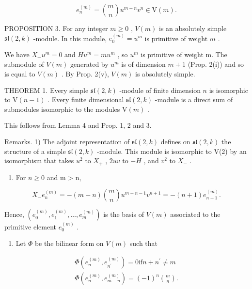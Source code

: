 \[
e _ {n} ^ {(m)} = \binom {m} {n} u ^ {m - n} v ^ {n} \in \mathrm{V} (m).
\]

PROPOSITION 3. For any integer \(m \geq 0\) , \(V(m)\) is an absolutely simple \(\mathfrak{sl}(2, k)\) -module. In this module, \(e_0^{(m)} = u^m\) is primitive of weight \(m\) .

We have \(X_{+}u^{m}=0\) and \(Hu^{m}=mu^{m}\) , so \(u^{m}\) is primitive of weight m. The submodule of \(V(m)\) generated by \(u^{m}\) is of dimension \(m+1\) (Prop. 2(i)) and so is equal to \(V(m)\) . By Prop. 2(v), \(V(m)\) is absolutely simple.

THEOREM 1. Every simple \(\mathfrak{sl}(2,k)\) -module of finite dimension \(n\) is isomorphic to \(\mathrm{V}(n - 1)\) . Every finite dimensional \(\mathfrak{sl}(2,k)\) -module is a direct sum of submodules isomorphic to the modules \(\mathrm{V}(m)\) .

This follows from Lemma 4 and Prop. 1, 2 and 3.

Remarks. 1) The adjoint representation of \(\mathfrak{sl}(2,k)\) defines on \(\mathfrak{sl}(2,k)\) the structure of a simple \(\mathfrak{sl}(2,k)\) -module. This module is isomorphic to V(2) by an isomorphism that takes \(u^2\) to \(X_+\) , \(2uv\) to \(-H\) , and \(v^2\) to \(X_-\) .

\begin{enumerate}
\def\labelenumi{\arabic{enumi})}
\setcounter{enumi}{1}
\tightlist
\item
  For \(n \geq 0\) and m \textgreater{} n,
\end{enumerate}

\[
X _ {-} e _ {n} ^ {(m)} = - (m - n) \binom{m}{n} u ^ {m - n - 1} v ^ {n + 1} = - (n + 1) e _ {n + 1} ^ {(m)}.
\]

Hence, \((e_0^{(m)}, e_1^{(m)}, \ldots, e_m^{(m)})\) is the basis of \(V(m)\) associated to the primitive element \(e_0^{(m)}\) .

\begin{enumerate}
\def\labelenumi{\arabic{enumi})}
\setcounter{enumi}{2}
\tightlist
\item
  Let \(\Phi\) be the bilinear form on \(V(m)\) such that
\end{enumerate}

\[
\begin{array}{c} \varPhi (e _ {n} ^ {(m)}, e _ {n ^ {\prime}} ^ {(m)}) = 0 \text {if} n + n ^ {\prime} \neq m \\ \varPhi (e _ {n} ^ {(m)}, e _ {m - n} ^ {(m)}) = (- 1) ^ {n} \binom {m} {n}. \end{array}
\]

